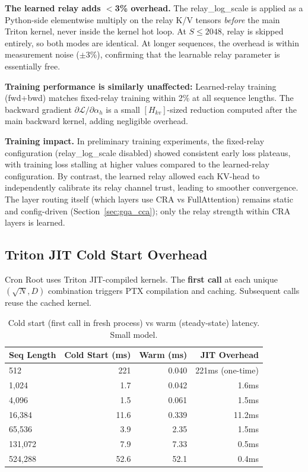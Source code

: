 \documentclass{article}
\begin{document}
    \textbf{The learned relay adds $<$3\% overhead.} The relay\_log\_scale is applied as a Python-side elementwise multiply on the relay K/V tensors \emph{before} the main Triton kernel, never inside the kernel hot loop. At $S \leq 2048$, relay is skipped entirely, so both modes are identical. At longer sequences, the overhead is within measurement noise ($\pm$3\%), confirming that the learnable relay parameter is essentially free.

    \textbf{Training performance is similarly unaffected:} Learned-relay training (fwd+bwd) matches fixed-relay training within 2\% at all sequence lengths. The backward gradient $\partial\mathcal{L}/\partial\alpha_h$ is a small $[H_{kv}]$-sized reduction computed after the main backward kernel, adding negligible overhead.

    \textbf{Training impact.} In preliminary training experiments, the fixed-relay configuration (relay\_log\_scale disabled) showed consistent early loss plateaus, with training loss stalling at higher values compared to the learned-relay configuration. By contrast, the learned relay allowed each KV-head to independently calibrate its relay channel trust, leading to smoother convergence. The layer routing itself (which layers use CRA vs FullAttention) remains static and config-driven (Section~\ref{sec:gqa_cca}); only the relay strength within CRA layers is learned.

    \subsection{Triton JIT Cold Start Overhead}

    Cron Root uses Triton JIT-compiled kernels. The \textbf{first call} at each unique $(\sqrt{N}, D)$ combination triggers PTX compilation and caching. Subsequent calls reuse the cached kernel.

    \begin{table}[h]
    \centering
    \caption{Cold start (first call in fresh process) vs warm (steady-state) latency. Small model.}
    \begin{tabular}{lrrr}
    \toprule
    Seq Length & Cold Start (ms) & Warm (ms) & JIT Overhead \\
    \midrule
    512 & 221 & 0.040 & 221ms (one-time) \\
    1,024 & 1.7 & 0.042 & 1.6ms \\
    4,096 & 1.5 & 0.061 & 1.5ms \\
    16,384 & 11.6 & 0.339 & 11.2ms \\
    65,536 & 3.9 & 2.35 & 1.5ms \\
    131,072 & 7.9 & 7.33 & 0.5ms \\
    524,288 & 52.6 & 52.1 & 0.4ms \\
    \bottomrule
    \end{tabular}
    \label{tab:coldstart}
    \end{table}
\end{document}
